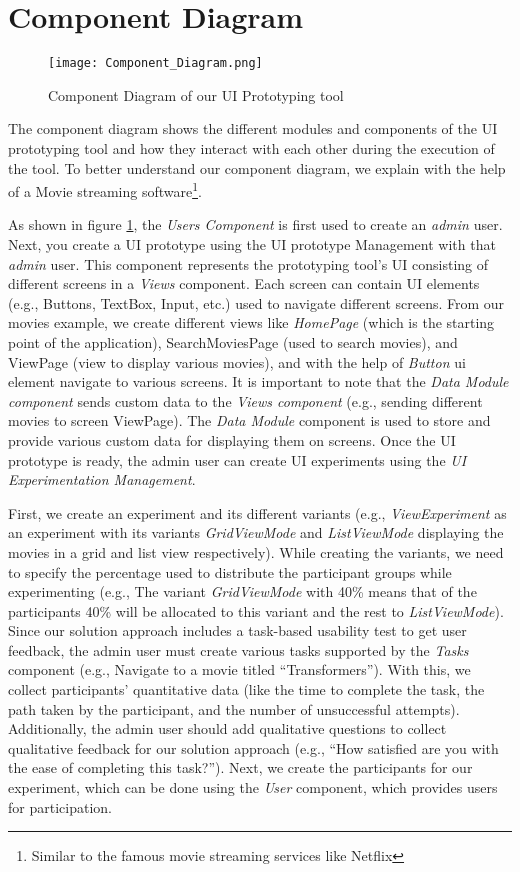 \section{Component Diagram}
\label{sc:section:componentD}
\begin{figure}[htbp!]
    \centering    
    \texttt{[image: Component\_Diagram.png]} 
    \caption[Component Diagram]{Component Diagram of our UI Prototyping tool}
    \label{fig:sc:componentD}
\end{figure}
The component diagram shows the different modules and components of the UI prototyping tool and how they interact with each other during the execution of the tool.
To better understand our component diagram, we explain with the help of a Movie streaming software\footnote{Similar to the famous movie streaming services like Netflix}.

As shown in figure \ref{fig:sc:componentD}, the \textit{Users Component} is first used to create an \textit{admin} user. 
Next, you create a UI prototype using the UI prototype Management with that \textit{admin} user. 
This component represents the prototyping tool's UI consisting of different screens in a \textit{Views} component. 
Each screen can contain UI elements (e.g., Buttons, TextBox, Input, etc.) used to navigate different screens.
From our movies example, we create different views like \textit{HomePage} (which is the starting point of the application), SearchMoviesPage (used to search movies), and ViewPage (view to display various movies), and with the help of \textit{Button} \ac{ui} element navigate to various screens.
It is important to note that the \textit{Data Module component} sends custom data to the \textit{Views component} (e.g., sending different movies to screen ViewPage).
The \textit{Data Module} component is used to store and provide various custom data for displaying them on screens.
Once the UI prototype is ready, the admin user can create UI experiments using the \textit{UI Experimentation Management}.

First, we create an experiment and its different variants (e.g., \textit{ViewExperiment} as an experiment with its variants \textit{GridViewMode} and \textit{ListViewMode} displaying the movies in a grid and list view respectively). 
While creating the variants, we need to specify the percentage used to distribute the participant groups while experimenting (e.g., The variant \textit{GridViewMode} with 40\% means that of the participants 40\% will be allocated to this variant and the rest to \textit{ListViewMode}).
Since our solution approach includes a task-based usability test to get user feedback, the admin user must create various tasks supported by the \textit{Tasks} component (e.g., Navigate to a movie titled ``Transformers'').
With this, we collect participants' quantitative data (like the time to complete the task, the path taken by the participant, and the number of unsuccessful attempts). 
Additionally, the admin user should add qualitative questions to collect qualitative feedback for our solution approach (e.g., ``How satisfied are you with the ease of completing this task?'').
Next, we create the participants for our experiment, which can be done using the \textit{User} component, which provides users for participation.

